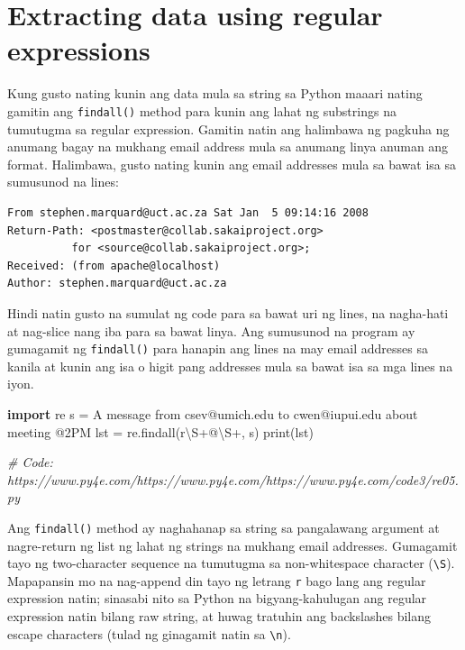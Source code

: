 \documentclass[10pt,]{book}
\newenvironment{Shaded}{}{}
\newcommand{\BuiltInTok}[1]{\textcolor[rgb]{0.00,0.50,0.00}{#1}}
\newcommand{\CommentTok}[1]{\textcolor[rgb]{0.38,0.63,0.69}{\textit{#1}}}
\newcommand{\DecValTok}[1]{\textcolor[rgb]{0.25,0.63,0.44}{#1}}
\newcommand{\ImportTok}[1]{\textcolor[rgb]{0.00,0.50,0.00}{\textbf{#1}}}
\newcommand{\NormalTok}[1]{#1}
\newcommand{\OperatorTok}[1]{\textcolor[rgb]{0.40,0.40,0.40}{#1}}
\newcommand{\StringTok}[1]{\textcolor[rgb]{0.25,0.44,0.63}{#1}}
\newcommand{\VerbatimStringTok}[1]{\textcolor[rgb]{0.25,0.44,0.63}{#1}}
\begin{document}

\section{Extracting data using regular
expressions}\label{extracting-data-using-regular-expressions}

Kung gusto nating kunin ang data mula sa string sa Python maaari nating
gamitin ang \texttt{findall()} method para kunin ang lahat ng substrings
na tumutugma sa regular expression. Gamitin natin ang halimbawa ng
pagkuha ng anumang bagay na mukhang email address mula sa anumang linya
anuman ang format. Halimbawa, gusto nating kunin ang email addresses
mula sa bawat isa sa sumusunod na lines:

{\small
\begin{verbatim}
From stephen.marquard@uct.ac.za Sat Jan  5 09:14:16 2008
Return-Path: <postmaster@collab.sakaiproject.org>
          for <source@collab.sakaiproject.org>;
Received: (from apache@localhost)
Author: stephen.marquard@uct.ac.za
\end{verbatim}
}

Hindi natin gusto na sumulat ng code para sa bawat uri ng lines, na
nagha-hati at nag-slice nang iba para sa bawat linya. Ang sumusunod na
program ay gumagamit ng \texttt{findall()} para hanapin ang lines na may
email addresses sa kanila at kunin ang isa o higit pang addresses mula
sa bawat isa sa mga lines na iyon.

 

\begin{Shaded}
\begin{Highlighting}[]
\ImportTok{import}\NormalTok{ re}
\NormalTok{s }\OperatorTok{=} \StringTok{\textquotesingle{}A message from csev@umich.edu to cwen@iupui.edu about meeting @2PM\textquotesingle{}}
\NormalTok{lst }\OperatorTok{=}\NormalTok{ re.findall(}\VerbatimStringTok{r\textquotesingle{}}\DecValTok{\textbackslash{}S}\OperatorTok{+}\VerbatimStringTok{@}\DecValTok{\textbackslash{}S}\OperatorTok{+}\VerbatimStringTok{\textquotesingle{}}\NormalTok{, s)}
\BuiltInTok{print}\NormalTok{(lst)}

\CommentTok{\# Code: https://www.py4e.com/https://www.py4e.com/https://www.py4e.com/code3/re05.py}
\end{Highlighting}
\end{Shaded}


Ang \texttt{findall()} method ay naghahanap sa string sa pangalawang
argument at nagre-return ng list ng lahat ng strings na mukhang email
addresses. Gumagamit tayo ng two-character sequence na tumutugma sa
non-whitespace character (\texttt{\textbackslash{}S}). Mapapansin mo na
nag-append din tayo ng letrang \texttt{r} bago lang ang regular
expression natin; sinasabi nito sa Python na bigyang-kahulugan ang
regular expression natin bilang raw string, at huwag tratuhin ang
backslashes bilang escape characters (tulad ng ginagamit natin sa
\texttt{\textbackslash{}n}).
\end{document}
